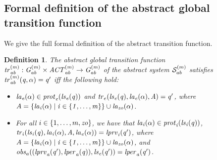 \documentclass{article}
\newtheorem{definition}{Definition}
\begin{document}
\subsection*{Formal definition of the abstract global transition function} 
We give the full formal definition of the abstract transition function.
\begin{definition}
  The {\em abstract global transition function} $\it{tr}^{(m)}_{ab} : G^{(m)}_{ab}
  \times \mathit{ACT}^{(m)}_{ab} \rightarrow G^{(m)}_{ab}$ of the abstract 
  system $\mathcal{S}^{(m)}_{ab}$ satisfies $\it{tr}^{(m)}_{ab}(q, \alpha) = q'$ iff the
  following hold:
  \begin{itemize}
    \item $\it{la}_{e}({\alpha}) \in \mathit{prot}_{e}({\it{ls}_{e}(q)})$ and $\mathit{tr}_{e}(\it{ls}_{e}(q),
    \it{la}_{e}({\alpha}), A) = q'$, where
    $A = \left \{ \it{la}_{i}({\alpha}) \mid i \in \left \{ 1,\ldots,m \right \} \right \} \cup
\it{la}_{zo}({\alpha})$.
    \item For all $i \in \left \{ 1,\ldots,m, \it{zo} \right \}$, we have that
    $\it{la}_{i}({\alpha}) \in \mathit{prot}_{i}(\it{ls}_{i}(q))$, $\mathit{tr}_{i} (\it{ls}_{i}(q), \it{la}_{i}({\alpha}),
    A, \it{la}_{e}({\alpha})) = \it{lprv}_{i}(q')$, where  $A = \left \{ \it{la}_{i}({\alpha}) \mid i \in
    \left \{ 1,\ldots,m \right \} \right \} \cup \it{la}_{zo}({\alpha})$, and $\mathit{obs}_{a}((\it{lprv}_{a}(q'),\it{lper}_{a}(q)),\it{ls}_{e}(q')) = \it{lper}_{a}(q')$.
  \end{itemize}
\end{definition}
\end{document}
